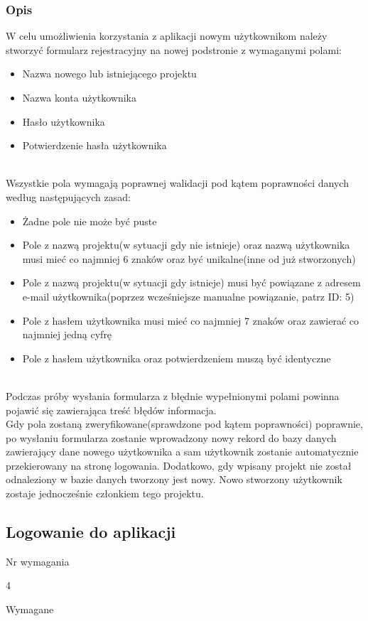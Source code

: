 \documentclass[eng,printmode]{mgr}
\begin{document}
\subsubsection{Opis}
W celu umożliwienia korzystania z aplikacji nowym użytkownikom należy stworzyć formularz rejestracyjny na nowej podstronie z wymaganymi polami:
\begin{itemize}
	\item[--] Nazwa nowego lub istniejącego projektu
	\item[--] Nazwa konta użytkownika
	\item[--] Hasło użytkownika
	\item[--] Potwierdzenie hasła użytkownika
\end{itemize}
\ \\
Wszystkie pola wymagają poprawnej walidacji pod kątem poprawności danych według następujących zasad:
\begin{itemize}
	\item[--] Żadne pole nie może być puste
	\item[--] Pole z nazwą projektu(w sytuacji gdy nie istnieje) oraz nazwą użytkownika musi mieć co najmniej 6 znaków oraz być unikalne(inne od już stworzonych)
	\item[--] Pole z nazwą projektu(w sytuacji gdy istnieje) musi być powiązane z adresem e-mail użytkownika(poprzez wcześniejsze manualne powiązanie, patrz ID: 5)
	\item[--] Pole z hasłem użytkownika musi mieć co najmniej 7 znaków oraz zawierać co najmniej jedną cyfrę
	\item[--] Pole z hasłem użytkownika oraz potwierdzeniem muszą być identyczne
\end{itemize}
\ \\
Podczas próby wysłania formularza z błędnie wypełnionymi polami powinna pojawić się zawierająca treść błędów informacja.
\\
Gdy pola zostaną zweryfikowane(sprawdzone pod kątem poprawności) poprawnie, po wysłaniu formularza zostanie wprowadzony nowy rekord do bazy danych zawierający dane nowego użytkownika a sam użytkownik zostanie automatycznie przekierowany na stronę logowania. Dodatkowo, gdy wpisany projekt nie został odnaleziony w bazie danych tworzony jest nowy. Nowo stworzony użytkownik zostaje jednocześnie członkiem tego projektu.

\subsection{Logowanie do aplikacji}
\begin{labeling}{Nr wymagania}
\item [Nr wymagania:] 4
\item [Priorytet:] Wymagane
\end{labeling}
\end{document}
